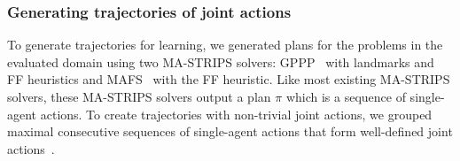 \documentclass[letterpaper]{article} %
\theoremstyle{definition}
\theoremstyle{remark}
\begin{document}
\subsubsection{Generating trajectories of joint actions}
To generate trajectories for learning, we generated plans for the problems in the evaluated domain using two MA-STRIPS solvers: GPPP~ with landmarks and FF heuristics and MAFS~ with the FF heuristic. 
Like most existing MA-STRIPS solvers, 
these MA-STRIPS solvers output a plan $\pi$ which is a sequence of single-agent actions. 
To create trajectories with non-trivial joint actions, we grouped maximal consecutive sequences of single-agent actions that form well-defined joint actions~\cite{crosby2014single}.
\end{document}
